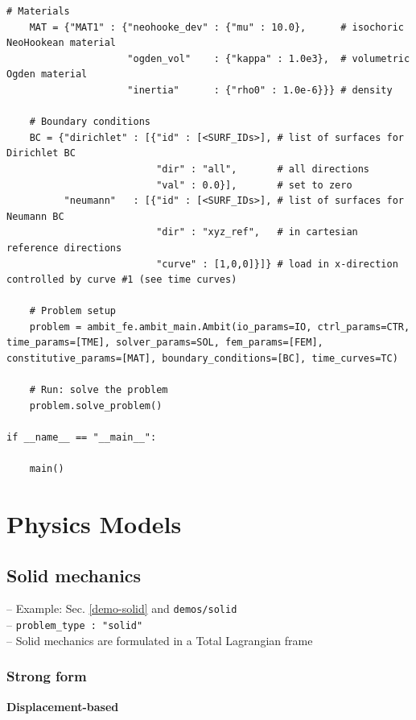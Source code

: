\documentclass[a4paper,12pt]{report}
\begin{document}
\begin{Verbatim}[breaklines=true]
    # Materials
    MAT = {"MAT1" : {"neohooke_dev" : {"mu" : 10.0},      # isochoric NeoHookean material
                     "ogden_vol"    : {"kappa" : 1.0e3},  # volumetric Ogden material
                     "inertia"      : {"rho0" : 1.0e-6}}} # density

    # Boundary conditions
    BC = {"dirichlet" : [{"id" : [<SURF_IDs>], # list of surfaces for Dirichlet BC
                          "dir" : "all",       # all directions
                          "val" : 0.0}],       # set to zero
          "neumann"   : [{"id" : [<SURF_IDs>], # list of surfaces for Neumann BC
                          "dir" : "xyz_ref",   # in cartesian reference directions
                          "curve" : [1,0,0]}]} # load in x-direction controlled by curve #1 (see time curves)

    # Problem setup
    problem = ambit_fe.ambit_main.Ambit(io_params=IO, ctrl_params=CTR, time_params=[TME], solver_params=SOL, fem_params=[FEM], constitutive_params=[MAT], boundary_conditions=[BC], time_curves=TC)

    # Run: solve the problem
    problem.solve_problem()
    
if __name__ == "__main__":

    main()
\end{Verbatim}

\section{Physics Models}\label{physics-models}

\subsection{Solid mechanics}\label{solid-mechanics}

-- Example: Sec. \ref{demo-solid} and \verb"demos/solid"\\

-- \verb.problem_type : "solid".\\

-- Solid mechanics are formulated in a Total Lagrangian frame

\subsubsection{Strong form}

\textbf{Displacement-based}\\
\end{document}
